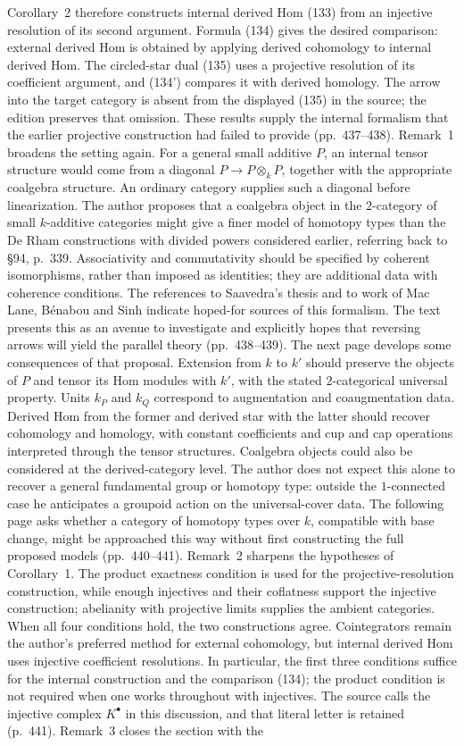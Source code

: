 Corollary~2 therefore constructs internal derived Hom (133) from an injective resolution of its second argument. Formula (134) gives the desired comparison: external derived Hom is obtained by applying derived cohomology to internal derived Hom. The circled-star dual (135) uses a projective resolution of its coefficient argument, and (134') compares it with derived homology. The arrow into the target category is absent from the displayed (135) in the source; the edition preserves that omission. These results supply the internal formalism that the earlier projective construction had failed to provide (pp.\ 437--438). Remark~1 broadens the setting again. For a general small additive $P$, an internal tensor structure would come from a diagonal $P\to P\otimes_k P$, together with the appropriate coalgebra structure. An ordinary category supplies such a diagonal before linearization. The author proposes that a coalgebra object in the $2$-category of small $k$-additive categories might give a finer model of homotopy types than the De Rham constructions with divided powers considered earlier, referring back to \S94, p.\ 339. Associativity and commutativity should be specified by coherent isomorphisms, rather than imposed as identities; they are additional data with coherence conditions. The references to Saavedra's thesis and to work of Mac Lane, Bénabou and Sinh indicate hoped-for sources of this formalism. The text presents this as an avenue to investigate and explicitly hopes that reversing arrows will yield the parallel theory (pp.\ 438--439). The next page develops some consequences of that proposal. Extension from $k$ to $k'$ should preserve the objects of $P$ and tensor its Hom modules with $k'$, with the stated $2$-categorical universal property. Units $k_P$ and $k_Q$ correspond to augmentation and coaugmentation data. Derived Hom from the former and derived star with the latter should recover cohomology and homology, with constant coefficients and cup and cap operations interpreted through the tensor structures. Coalgebra objects could also be considered at the derived-category level. The author does not expect this alone to recover a general fundamental group or homotopy type: outside the $1$-connected case he anticipates a groupoid action on the universal-cover data. The following page asks whether a category of homotopy types over $k$, compatible with base change, might be approached this way without first constructing the full proposed models (pp.\ 440--441). Remark~2 sharpens the hypotheses of Corollary~1. The product exactness condition is used for the projective-resolution construction, while enough injectives and their coflatness support the injective construction; abelianity with projective limits supplies the ambient categories. When all four conditions hold, the two constructions agree. Cointegrators remain the author's preferred method for external cohomology, but internal derived Hom uses injective coefficient resolutions. In particular, the first three conditions suffice for the internal construction and the comparison (134); the product condition is not required when one works throughout with injectives. The source calls the injective complex $K^\bullet$ in this discussion, and that literal letter is retained (p.\ 441). Remark~3 closes the section with the 